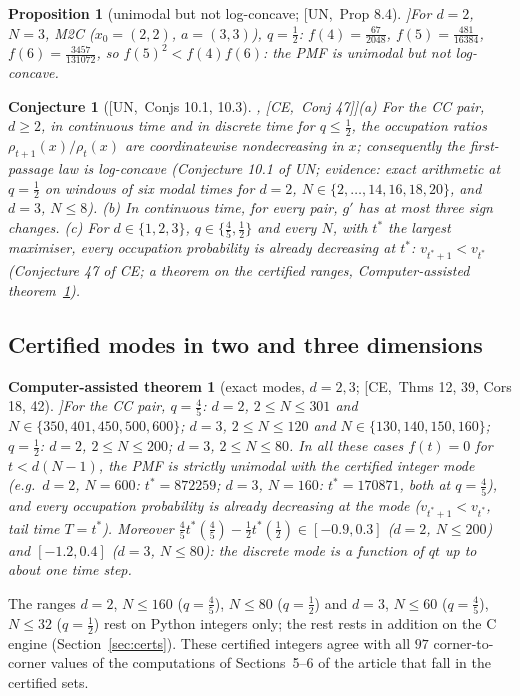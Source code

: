 \documentclass[10pt,a4paper]{article}
\theoremstyle{plain}
\newtheorem{catheorem}[theorem]{Computer-assisted theorem}
\newtheorem{proposition}[theorem]{Proposition}
\newtheorem{conjecture}[theorem]{Conjecture}
\theoremstyle{definition}
\newcommand{\src}[2]{[\textsf{#1},~#2]}           %
\newcommand{\UNI}{\textsf{UN}}
\newcommand{\CER}{\textsf{CE}}
\begin{document}
\begin{proposition}[unimodal but not log-concave; \src{\UNI}{Prop 8.4}]\label{prop:m2c-notlc}
For $d=2$, $N=3$, M2C ($x_0=(2,2)$, $a=(3,3)$), $q=\frac12$: $f(4)=\frac{67}{2048}$, $f(5)=\frac{481}{16384}$, $f(6)=\frac{3457}{131072}$, so $f(5)^2<f(4)f(6)$: the PMF is unimodal but not log-concave.
\end{proposition}

\begin{conjecture}[\src{\UNI}{Conjs 10.1, 10.3}, \src{\CER}{Conj 47}]\label{conj:shape}
(a) For the CC pair, $d\ge2$, in continuous time and in discrete time for $q\le\frac12$, the occupation ratios $\rho_{t+1}(x)/\rho_t(x)$ are coordinatewise nondecreasing in $x$; consequently the first-passage law is log-concave (Conjecture 10.1 of \UNI; evidence: exact arithmetic at $q=\frac12$ on windows of six modal times for $d=2$, $N\in\{2,\dots,14,16,18,20\}$, and $d=3$, $N\le8$). (b) In continuous time, for every pair, $g'$ has at most three sign changes. (c) For $d\in\{1,2,3\}$, $q\in\{\frac45,\frac12\}$ and every $N$, with $t^*$ the largest maximiser, every occupation probability is already decreasing at $t^*$: $v_{t^*+1}<v_{t^*}$ (Conjecture 47 of \CER; a theorem on the certified ranges, Computer-assisted theorem~\ref{thm:cc-certified}).
\end{conjecture}

\subsection{Certified modes in two and three dimensions}

\begin{catheorem}[exact modes, $d=2,3$; \src{\CER}{Thms 12, 39, Cors 18, 42}]\label{thm:cc-certified}
For the CC pair, $q=\frac45$: $d=2$, $2\le N\le301$ and $N\in\{350,401,450,500,600\}$; $d=3$, $2\le N\le120$ and $N\in\{130,140,150,160\}$; $q=\frac12$: $d=2$, $2\le N\le200$; $d=3$, $2\le N\le80$. In all these cases $f(t)=0$ for $t<d(N-1)$, the PMF is strictly unimodal with the certified integer mode (e.g.\ $d=2$, $N=600$: $t^*=872259$; $d=3$, $N=160$: $t^*=170871$, both at $q=\frac45$), and every occupation probability is already decreasing at the mode ($v_{t^*+1}<v_{t^*}$, tail time $T=t^*$). Moreover $\frac45t^*(\frac45)-\frac12t^*(\frac12)\in[-0.9,0.3]$ ($d=2$, $N\le200$) and $[-1.2,0.4]$ ($d=3$, $N\le80$): the discrete mode is a function of $qt$ up to about one time step.
\end{catheorem}
The ranges $d=2$, $N\le160$ ($q=\frac45$), $N\le80$ ($q=\frac12$) and $d=3$, $N\le60$ ($q=\frac45$), $N\le32$ ($q=\frac12$) rest on Python integers only; the rest rests in addition on the C engine (Section~\ref{sec:certs}). These certified integers agree with all $97$ corner-to-corner values of the computations of Sections~5--6 of the article that fall in the certified sets.
\end{document}

